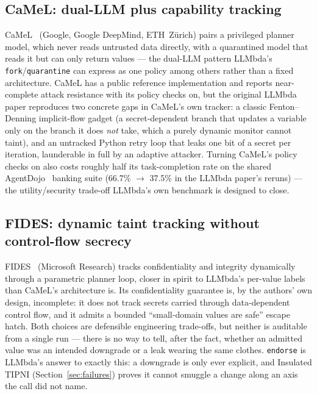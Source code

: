 \documentclass[11pt, a4paper]{article}
\begin{document}
\begin{descirption}
{\subsection{CaMeL: dual-LLM plus capability tracking}

CaMeL~\cite{camel} (Google, Google DeepMind, ETH~Z\"urich) pairs a
privileged planner model, which never reads untrusted data directly,
with a quarantined model that reads it but can only return values ---
the dual-LLM pattern LLMbda's \lstinline{fork}/\lstinline{quarantine}
can express as one policy among others rather than a fixed
architecture. CaMeL has a public reference implementation and reports
near-complete attack resistance with its policy checks on, but the
original LLMbda paper reproduces two concrete gaps in CaMeL's own
tracker: a classic Fenton--Denning implicit-flow gadget (a
secret-dependent branch that updates a variable only on the branch it
does \emph{not} take, which a purely dynamic monitor cannot taint), and
an untracked Python retry loop that leaks one bit of a secret per
iteration, launderable in full by an adaptive attacker. Turning CaMeL's
policy checks on also costs roughly half its task-completion rate on
the shared AgentDojo~\cite{agentdojo} banking suite (66.7\%
$\rightarrow$ 37.5\% in the LLMbda paper's reruns) --- the
utility/security trade-off LLMbda's own benchmark is designed to close.

\subsection{FIDES: dynamic taint tracking without control-flow secrecy}

FIDES~\cite{fides} (Microsoft Research) tracks confidentiality and
integrity dynamically through a parametric planner loop, closer in
spirit to LLMbda's per-value labels than CaMeL's architecture is. Its
confidentiality guarantee is, by the authors' own design, incomplete:
it does not track secrets carried through data-dependent control flow,
and it admits a bounded ``small-domain values are safe'' escape hatch.
Both choices are defensible engineering trade-offs, but neither is
auditable from a single run --- there is no way to tell, after the
fact, whether an admitted value was an intended downgrade or a leak
wearing the same clothes. \lstinline{endorse} is LLMbda's answer to
exactly this: a downgrade is only ever explicit, and Insulated TIPNI
(Section~\ref{sec:failures}) proves it cannot smuggle a change along an
axis the call did not name.

}
\end{descirption}
\end{document}
